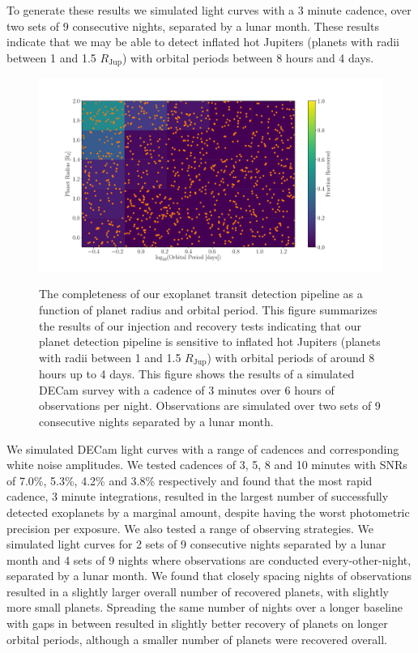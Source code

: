 To generate these results we simulated light curves with a 3 minute cadence,
over two sets of 9 consecutive nights, separated by a lunar month.
These results indicate that we may be able to detect inflated hot Jupiters
(planets with radii between 1 and 1.5 $R_{\mathrm{Jup}}$) with orbital periods
between 8 hours and 4 days.

\begin{figure}
  \caption{The completeness of our exoplanet transit detection pipeline as a
    function of planet radius and orbital period.
    This figure summarizes the results of our injection and recovery tests
    indicating that our planet detection pipeline is sensitive to inflated hot
    Jupiters (planets with radii between 1 and 1.5 $R_{\mathrm{Jup}}$) with
    orbital periods of around 8 hours up to 4 days.
    This figure shows the results of a simulated DECam survey with a cadence
    of 3 minutes over 6 hours of observations per night.  Observations are
    simulated over two sets of 9 consecutive nights separated
    by a lunar month.
}
  \centering
    \includegraphics[width=.7\textwidth]{../completeness.pdf}
\label{fig:completeness}
\end{figure}

We simulated DECam light curves with a range of cadences and corresponding
white noise amplitudes.
We tested cadences of 3, 5, 8 and 10 minutes with SNRs of 7.0\%, 5.3\%, 4.2\%
and 3.8\% respectively and found that the most rapid cadence, 3 minute
integrations, resulted in the largest number of successfully detected
exoplanets by a marginal amount, despite having the worst photometric
precision per exposure.
We also tested a range of observing strategies.
We simulated light curves for 2 sets of 9 consecutive nights separated by a
lunar month and 4 sets of 9 nights where observations are conducted
every-other-night, separated by a lunar month.
We found that closely spacing nights of observations resulted in a slightly
larger overall number of recovered planets, with slightly more small planets.
Spreading the same number of nights over a longer baseline with gaps in
between resulted in slightly better recovery of planets on longer orbital
periods, although a smaller number of planets were recovered overall.

